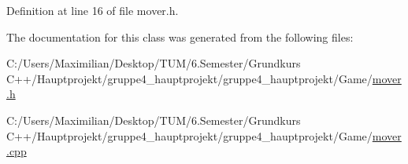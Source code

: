 Definition at line 16 of file mover.\+h.



The documentation for this class was generated from the following files\+:\begin{DoxyCompactItemize}
\item 
C\+:/\+Users/\+Maximilian/\+Desktop/\+T\+U\+M/6.\+Semester/\+Grundkurs C++/\+Hauptprojekt/gruppe4\+\_\+hauptprojekt/gruppe4\+\_\+hauptprojekt/\+Game/\hyperlink{mover_8h}{mover.\+h}\item 
C\+:/\+Users/\+Maximilian/\+Desktop/\+T\+U\+M/6.\+Semester/\+Grundkurs C++/\+Hauptprojekt/gruppe4\+\_\+hauptprojekt/gruppe4\+\_\+hauptprojekt/\+Game/\hyperlink{mover_8cpp}{mover.\+cpp}\end{DoxyCompactItemize}
